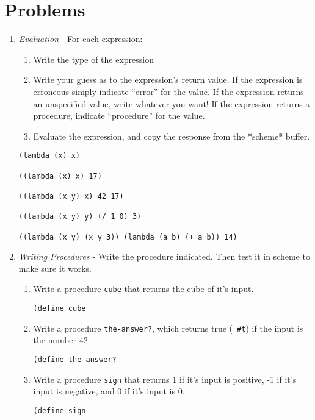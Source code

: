 \section*{Problems}

\begin{enumerate}

\item {\large {\it Evaluation}} - For each expression:
\begin{enumerate}
\item Write the type of the expression
\item Write your guess as to the expression's return value.
If the expression is erroneous simply indicate ``error'' for the value.  
If the expression returns an unspecified value, write whatever you want!
If the expression returns a procedure, indicate ``procedure'' for the value.
\item Evaluate the expression, and copy the response from the *scheme* buffer.
\end{enumerate}

\begin{verbatim}
(lambda (x) x)

((lambda (x) x) 17)

((lambda (x y) x) 42 17)

((lambda (x y) y) (/ 1 0) 3)

((lambda (x y) (x y 3)) (lambda (a b) (+ a b)) 14)
\end{verbatim}

\item {\large {\it Writing Procedures}} - Write the procedure
indicated.  Then test it in scheme to make sure it works.
\begin{enumerate}
\item Write a procedure {\tt cube} that returns the cube of it's input.
\begin{verbatim}
(define cube
\end{verbatim}
\vspace{.5in}

\item Write a procedure {\tt the-answer?}, which returns true ({\tt
\#t}) if the input is the number 42.
\begin{verbatim}
(define the-answer?
\end{verbatim}
\vspace{1in}

\item Write a procedure {\tt sign} that returns 1 if it's input is
positive, -1 if it's input is negative, and 0 if it's input is 0.
\begin{verbatim}
(define sign
\end{verbatim}
\vspace{1in}


\end{enumerate}
\end{enumerate}
